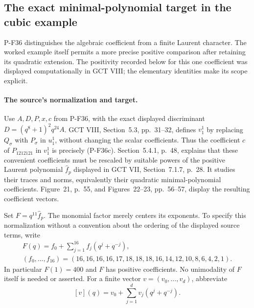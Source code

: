 \documentclass[11pt,a4paper]{article}
\begin{document}
\subsection{The exact minimal-polynomial target in the cubic example}

P-F36 distinguishes the algebraic coefficient from a finite Laurent
character. The worked example itself permits a more precise positive
comparison after retaining its quadratic extension. The positivity
recorded below for this one coefficient was displayed computationally
in GCT VIII; the elementary identities make its scope explicit.

\paragraph{The source's normalization and target.}
Use $A,D,P,x,c$ from P-F36, with the exact displayed discriminant
$D=(q^8+1)^2q^{24}A$. GCT VIII, Section~5.3, pp.~31--32,
defines $v_1^1$ by replacing $Q_\sigma$ with $P_\sigma$ in
$u_1^1$, without changing the scalar coefficients. Thus the coefficient
$c$ of $P_{1212121}$ in $v_1^1$ is precisely (P-F36c).
Section~5.4.1, p.~48, explains that these convenient coefficients must
be rescaled by suitable powers of the positive Laurent polynomial
$\widehat f_p$ displayed in GCT VII, Section~7.1.7, p.~28.
It studies their traces and norms, equivalently their quadratic
minimal-polynomial coefficients. Figure~21, p.~55, and
Figures~22--23, pp.~56--57, display the resulting coefficient vectors.

Set $F=q^{11}\widehat f_p$. The monomial factor merely centers its
exponents. To specify this normalization without a convention about
the ordering of the displayed source terms, write
\[
 \begin{gathered}
 F(q)=f_0+\sum_{j=1}^{16}f_j(q^j+q^{-j}),\\
 (f_0,\ldots,f_{16})=
 (16,16,16,16,17,18,18,18,16,14,12,10,8,6,4,2,1).
 \end{gathered}
 \tag{P-F39a}
\]
In particular $F(1)=400$ and $F$ has positive coefficients.
No unimodality of $F$ itself is needed or asserted.
For a finite vector $v=(v_0,\ldots,v_d)$, abbreviate
\[
 [v](q)=v_0+\sum_{j=1}^d v_j(q^j+q^{-j}).
\]
\end{document}
